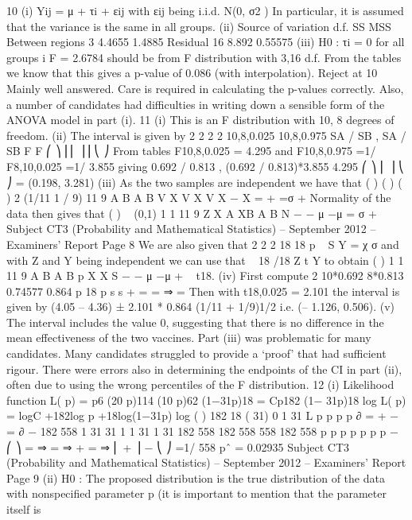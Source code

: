   10 (i) Yij = μ + τi + εij
with εij being i.i.d. N(0, σ2 )
In particular, it is assumed that the variance is the same in all groups.
(ii)
Source of variation d.f. SS MSS
Between regions 3 4.4655 1.4885
Residual 16 8.892 0.55575
(iii) H0 : τi = 0 for all groups i
F = 2.6784 should be from F distribution with 3,16 d.f.
From the tables we know that this gives a p-value of 0.086 (with
                                                            interpolation).
Reject at 10%
Mainly well answered. Care is required in calculating the p-values correctly. Also, a number
of candidates had difficulties in writing down a sensible form of the ANOVA model in part (i).
11 (i) This is an F distribution with 10, 8 degrees of freedom.
(ii) The interval is given by
2 2 2 2
10,8,0.025 10,8,0.975
SA / SB , SA / SB
F F
⎛ ⎞
⎜⎜ ⎟⎟
⎝ ⎠
From tables F10,8,0.025 = 4.295 and F10,8,0.975 =1/ F8,10,0.025 =1/ 3.855
giving 0.692 / 0.813 , (0.692 / 0.813)*3.855
4.295
⎛ ⎞
⎜ ⎟
⎝ ⎠
= (0.198, 3.281)
(iii) As the two samples are independent we have that
( ) ( ) ( ) 2 (1/11 1 / 9)
11 9
A B
A B
V X V X
V X − X = + =σ +
  Normality of the data then gives that ( ) ~ (0,1)
1 1
11 9
Z X A XB A B N
− − μ −μ
=
  σ +
  Subject CT3 (Probability and Mathematical Statistics) – September 2012 – Examiners’ Report
Page 8
We are also given that
2
2
2 18
18
p ~ S
Y = χ
σ
and with Z and Y being independent
we can use that ~ 18
/18
Z t
Y
to obtain ( )
1 1
11 9
A B A B
p
X X
S
− − μ −μ
+
  ~ t18.
(iv) First compute 2 10*0.692 8*0.813 0.74577 0.864
p 18 p s s +
  = = ⇒ =
  Then with t18,0.025 = 2.101 the interval is given by (4.05 – 4.36) ± 2.101 *
  0.864 (1/11 + 1/9)1/2 i.e. (– 1.126, 0.506).
(v) The interval includes the value 0, suggesting that there is no difference in the
mean effectiveness of the two vaccines.
Part (iii) was problematic for many candidates. Many candidates struggled to provide a
‘proof’ that had sufficient rigour. There were errors also in determining the endpoints of the
CI in part (ii), often due to using the wrong percentiles of the F distribution.
12 (i) Likelihood function
L( p) = p6 (20 p)114 (10 p)62 (1−31p)18 = Cp182 (1− 31p)18
log L( p) = logC +182log p +18log(1−31p)
log ( ) 182 18 ( 31) 0
1 31
L p
p p p
∂
= + − =
  ∂ −
182 558 1 31 31 1 1 31
1 31 182 558 182 558 558 182 558
p p p p p
p p
− ⎛ ⎞ = ⇒ = ⇒ + = ⇒ ⎜ + ⎟ − ⎝ ⎠
=1/ 558
pˆ = 0.02935
Subject CT3 (Probability and Mathematical Statistics) – September 2012 – Examiners’ Report
Page 9
(ii) H0 : The proposed distribution is the true distribution of the data with nonspecified
parameter p (it is important to mention that the parameter itself is
